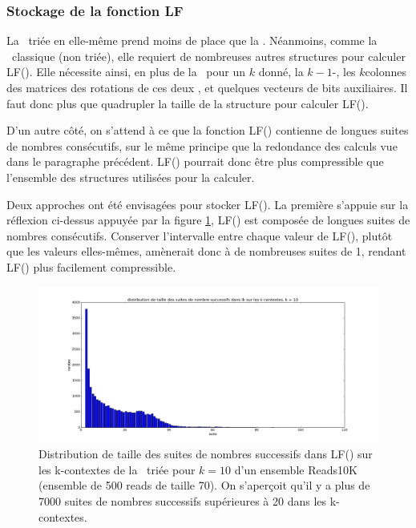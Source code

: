 \subsubsection{Stockage de la fonction LF}
La \kbwt\ triée en elle-même prend moins de place que la \bwt. Néanmoins, comme la \kbwt\ classique (non triée), elle requiert de nombreuses autres structures pour calculer LF(). Elle nécessite ainsi, en plus de la \kbwt\ pour un $k$ donné, la $k-1$-\bwt, les $k$\ieme colonnes des matrices des rotations de ces deux \kbwt, et quelques vecteurs de bits auxiliaires. Il faut donc plus que quadrupler la taille de la structure pour calculer LF().

D'un autre côté, on s'attend à ce que la fonction LF() contienne de longues suites de nombres consécutifs, sur le même principe que la redondance des calculs vue dans le paragraphe précédent. LF() pourrait donc être plus compressible que l'ensemble des structures utilisées pour la calculer.

Deux approches ont été envisagées pour stocker LF(). La première s'appuie sur la réflexion ci-dessus appuyée par la figure \ref{suitesLF}, LF() est composée de longues suites de nombres consécutifs. Conserver l'intervalle entre chaque valeur de LF(), plutôt que les valeurs elles-mêmes, amènerait donc à de nombreuses suites de 1, rendant LF() plus facilement compressible.

\begin{figure}[!ht]
    \center
    \includegraphics[scale = 0.3]{./images/suitesLFreads10K_k10.png}
    \caption{Distribution de taille des suites de nombres successifs dans LF() sur les k-contextes de la \kbwt\ triée pour $k = 10$ d'un ensemble Reads10K (ensemble de 500 reads de taille 70). On s'aperçoit qu'il y a plus de 7000 suites de nombres successifs supérieures à 20 dans les k-contextes.}
    \label{suitesLF}
\end{figure}

